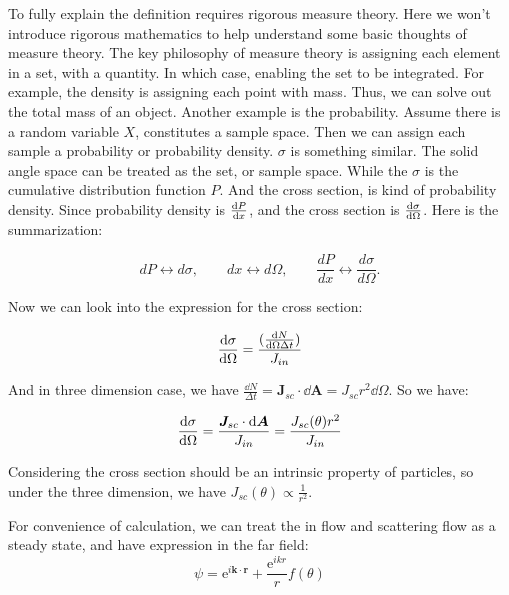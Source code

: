 \documentclass[../main.tex]{subfiles}
\begin{document}
To fully explain the definition requires rigorous measure theory. Here we won't introduce rigorous mathematics to help understand some basic thoughts of measure theory. The key philosophy of measure theory is assigning each element in a set, with a quantity. In which case, enabling the set to be integrated. For example, the density is assigning each point with mass. Thus, we can solve out the total mass of an object. Another example is the probability. Assume there is a random variable $X$, constitutes a sample space. Then we can assign each sample a probability or probability density. $\sigma$ is something similar. The solid angle space can be treated as the set, or sample space. While the $\sigma$ is the cumulative distribution function $P$. And the cross section, is kind of probability density. Since probability density is $\dv{P}{x}$, and the cross section is $\dv{\sigma}{\Omega}$. Here is the summarization:

\begin{equation}
    dP \leftrightarrow d\sigma,\qquad dx \leftrightarrow d\Omega,\qquad\frac{dP}{dx} \leftrightarrow \frac{d\sigma}{d\Omega}.
\end{equation}

Now we can look into the expression for the cross section:

\begin{equation}
    \label{eq:definition_of_cross_section}
    \dv{\sigma}{\Omega} = \frac{(\frac{\dd{N}}{\dd{\Omega}\Delta t})}{J_{in}}
\end{equation}

And in three dimension case, we have $\frac{\dd{N}}{\Delta t} = \bm{J}_{sc} \cdot \dd{\bm{A}} = J_{sc}  r^2\dd{\Omega}$. So we have:

\begin{equation}
    \dv{\sigma}{\Omega} = \frac{\bm{J}_{sc} \cdot \dd{\bm{A}}}{J_{in}} = \frac{J_{sc}(\theta) r^2}{J_{in}}
\end{equation}

Considering the cross section should be an intrinsic property of particles, so under the three dimension, we have $J_{sc}(\theta) \propto \frac{1}{r^2}$.

For convenience of calculation, we can treat the in flow and scattering flow as a steady state, and have expression in the far field:
\begin{equation}
    \psi = \textrm{e}^{i\bm{k}\cdot\bm{r}} + \frac{\textrm{e}^{ikr}}{r}f(\theta)
\end{equation}
\end{document}
